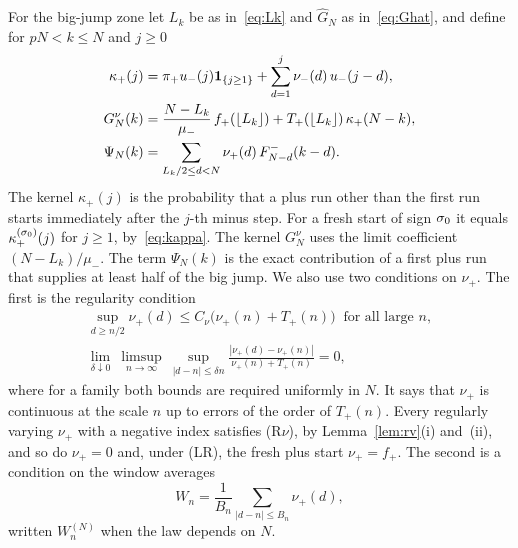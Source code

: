 For the big-jump zone let $L_k$ be as in~\eqref{eq:Lk} and $\widehat G_N$ as
in~\eqref{eq:Ghat}, and define for $pN<k\le N$ and $j\ge0$
\begin{align}
 \kappa_{+}(j)&=\pi_{+} u_{-}(j)\mathbf{1}_{\{j\ge1\}}+\sum_{d=1}^{j}\nu_{-}(d)\,u_{-}(j-d),
 \label{eq:kappa-prep}\\
 G^\nu_N(k)&=\frac{N-L_k}{\mu_{-}}\,f_{+}(\lfloor L_k\rfloor)+T_{+}(\lfloor L_k\rfloor)\,\kappa_{+}(N-k),
 \label{eq:G-prep}\\
 \Psi_N(k)&=\sum_{L_k/2\le d<N}\nu_{+}(d)\,F^{-}_{N-d}(k-d).
 \label{eq:Psi}
\end{align}
The kernel $\kappa_\plus(j)$ is the probability that a plus run other than the
first run starts immediately after the $j$-th minus step. For a fresh start of
sign $\sigma_0$ it equals $\kappa^{(\sigma_0)}_{+}(j)$ for $j\ge1$, by~\eqref{eq:kappa}.
The kernel $G^\nu_N$ uses the limit coefficient $(N-L_k)/\mu_\minus$. The term
$\Psi_N(k)$ is the exact contribution of a first plus run that supplies at least
half of the big jump. We also use two conditions on $\nu_\plus$. The first is the
regularity condition
\begin{equation}\label{eq:Rnu}\tag{R$\nu$}
\begin{gathered}
 \sup_{d\ge n/2}\nu_\plus(d)\le C_\nu\bigl(\nu_\plus(n)+T_\plus(n)\bigr)\ \text{ for all large $n$},\\
 \lim_{\delta\downarrow0}\ \limsup_{n\to\infty}\ \sup_{|d-n|\le\delta n}
 \frac{|\nu_\plus(d)-\nu_\plus(n)|}{\nu_\plus(n)+T_\plus(n)}=0 ,
\end{gathered}
\end{equation}
where for a family both bounds are required uniformly in $N$. It says that $\nu_\plus$ is
continuous at the scale $n$ up to errors of the order of $T_\plus(n)$. Every regularly
varying $\nu_\plus$ with a negative index satisfies (R$\nu$), by Lemma~\ref{lem:rv}(i)
and~(ii), and so do $\nu_\plus=0$ and, under (LR), the fresh plus start $\nu_\plus=f_\plus$.
The second is a condition on the window averages
\[
 W_n=\frac1{B_n}\sum_{|d-n|\le B_n}\nu_\plus(d),
\]
written $W^{(N)}_n$ when the law depends on $N$.

